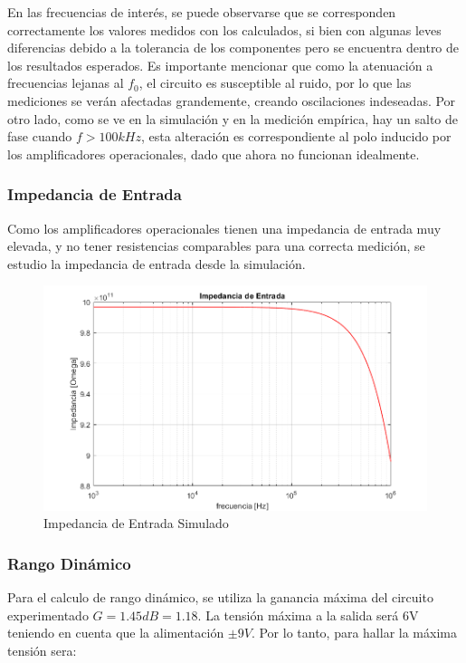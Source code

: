 En las frecuencias de interés, se puede observarse que se corresponden correctamente los valores medidos con los calculados, si bien con algunas leves diferencias debido a la tolerancia de los componentes pero se encuentra dentro de los resultados esperados. Es importante mencionar que como la atenuación a frecuencias lejanas al $f_0$, el circuito es susceptible al ruido, por lo que las mediciones se verán afectadas grandemente, creando oscilaciones indeseadas. Por otro lado, como se ve en la simulación y en la medición empírica, hay un salto de fase cuando $f>100kHz$, esta alteración es correspondiente al polo inducido por los amplificadores operacionales, dado que ahora no funcionan idealmente. 


\subsubsection{Impedancia de Entrada}

Como los amplificadores operacionales tienen una impedancia de entrada muy elevada, y no tener resistencias comparables para una correcta medición, se estudio la impedancia de entrada desde la simulación.

\begin{figure}[H]
    \centering
    \includegraphics[scale = 0.5]{../Ejercicio2-DisenoDeCeldas/2CELDARAUCH/Informe/zin.png}
    \caption{Impedancia de Entrada Simulado}
    \label{ej22zin}
\end{figure}

\subsubsection{Rango Dinámico}

Para el calculo de rango dinámico, se utiliza la ganancia máxima del circuito experimentado $G = 1.45dB = 1.18$. La tensi\'on m\'axima a la salida ser\'a 6V teniendo en cuenta que la alimentaci\'on $\pm 9V$. Por lo tanto, para hallar la m\'axima tensión sera:

